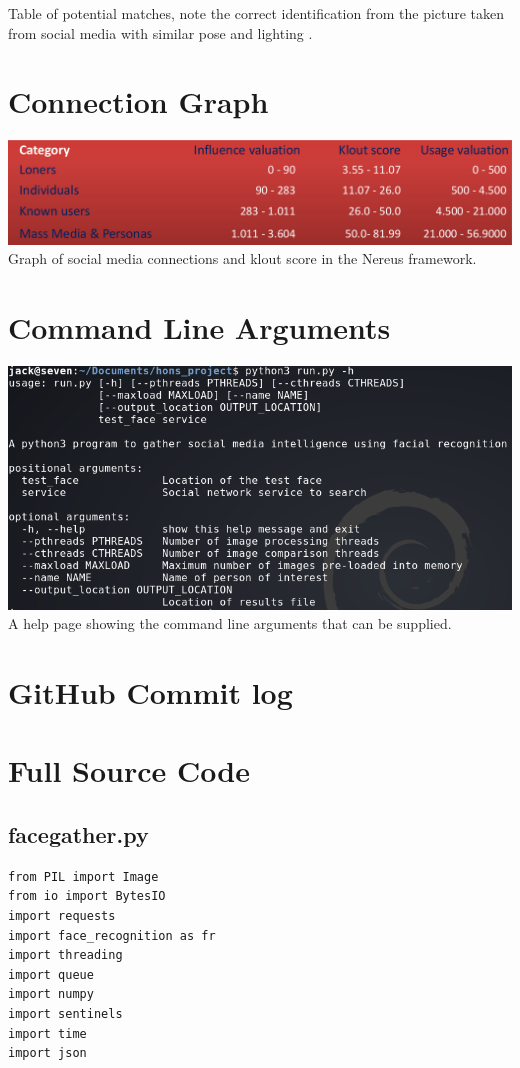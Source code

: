 \documentclass[12pt]{article}
\begin{document}
\begin{appendices}
Table of potential matches, note the correct identification from the picture taken from social media with similar pose and lighting \citep{bostonbombingcasestudy}.

\section{Connection Graph}
\label{appendix:connectiongraph}
\includegraphics[width=\linewidth]{res/connection_klout.png}
Graph of social media connections and klout score in the Nereus framework\citep{behaviourdetection}.

\section{Command Line Arguments}
\label{appendix:commandlineargs}
\includegraphics[width=\linewidth]{res/facegather_cmd_line_args.png}
A help page showing the command line arguments that can be supplied.

\section{GitHub Commit log}
\label{appendix:githubcommitlog}


\section{Full Source Code}
\subsection{facegather.py}
\begin{lstlisting}
from PIL import Image
from io import BytesIO
import requests
import face_recognition as fr
import threading
import queue
import numpy
import sentinels
import time
import json


\end{lstlisting}
\end{appendices}
\end{document}

